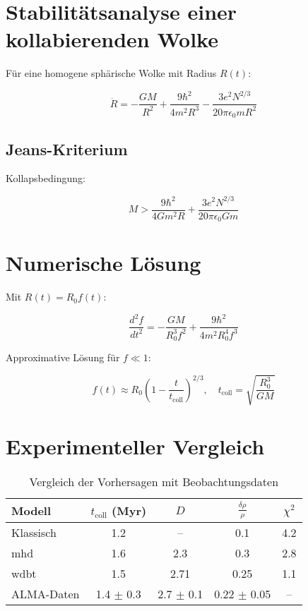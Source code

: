 \section{Stabilitätsanalyse einer kollabierenden Wolke}
Für eine homogene sphärische Wolke mit Radius $R(t)$:

\begin{equation}
\ddot{R} = -\frac{GM}{R^2} + \frac{9\hbar^2}{4m^2R^3} - \frac{3e^2N^{2/3}}{20\pi\epsilon_0 m R^2}
\end{equation}

\subsection{Jeans-Kriterium}
Kollapsbedingung:

\begin{equation}
M > \frac{9\hbar^2}{4Gm^2R} + \frac{3e^2N^{2/3}}{20\pi\epsilon_0 Gm}
\end{equation}

\section{Numerische Lösung}
Mit $R(t) = R_0 f(t)$:

\begin{equation}
\frac{d^2f}{dt^2} = -\frac{GM}{R_0^3 f^2} + \frac{9\hbar^2}{4m^2R_0^4 f^3}
\end{equation}

Approximative Lösung für $f \ll 1$:

\begin{equation}
f(t) \approx R_0\left(1 - \frac{t}{t_{\text{coll}}}\right)^{2/3}, \quad t_{\text{coll}} = \sqrt{\frac{R_0^3}{GM}}
\end{equation}

\section{Experimenteller Vergleich}

\begin{table}[h]
\centering
\caption{Vergleich der Vorhersagen mit Beobachtungsdaten}
\begin{tabular}{lcccc}
\toprule
Modell & $t_{\text{coll}}$ (Myr) & $D$ & $\frac{\delta\rho}{\rho}$ & $\chi^2$ \\
\midrule
Klassisch & 1.2 & -- & 0.1 & 4.2 \\
\gls{mhd} & 1.6 & 2.3 & 0.3 & 2.8 \\
\gls{wdbt} & 1.5 & 2.71 & 0.25 & 1.1 \\
ALMA-Daten & 1.4 $\pm$ 0.3 & 2.7 $\pm$ 0.1 & 0.22 $\pm$ 0.05 & -- \\
\bottomrule
\end{tabular}
\end{table}

